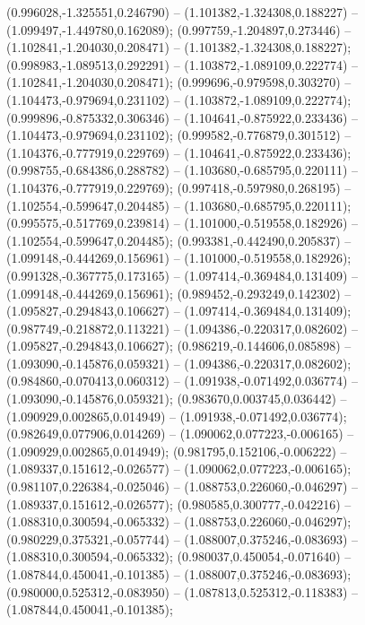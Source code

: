  (0.996028,-1.325551,0.246790) -- (1.101382,-1.324308,0.188227) -- (1.099497,-1.449780,0.162089);
 (0.997759,-1.204897,0.273446) -- (1.102841,-1.204030,0.208471) -- (1.101382,-1.324308,0.188227);
 (0.998983,-1.089513,0.292291) -- (1.103872,-1.089109,0.222774) -- (1.102841,-1.204030,0.208471);
 (0.999696,-0.979598,0.303270) -- (1.104473,-0.979694,0.231102) -- (1.103872,-1.089109,0.222774);
 (0.999896,-0.875332,0.306346) -- (1.104641,-0.875922,0.233436) -- (1.104473,-0.979694,0.231102);
 (0.999582,-0.776879,0.301512) -- (1.104376,-0.777919,0.229769) -- (1.104641,-0.875922,0.233436);
 (0.998755,-0.684386,0.288782) -- (1.103680,-0.685795,0.220111) -- (1.104376,-0.777919,0.229769);
 (0.997418,-0.597980,0.268195) -- (1.102554,-0.599647,0.204485) -- (1.103680,-0.685795,0.220111);
 (0.995575,-0.517769,0.239814) -- (1.101000,-0.519558,0.182926) -- (1.102554,-0.599647,0.204485);
 (0.993381,-0.442490,0.205837) -- (1.099148,-0.444269,0.156961) -- (1.101000,-0.519558,0.182926);
 (0.991328,-0.367775,0.173165) -- (1.097414,-0.369484,0.131409) -- (1.099148,-0.444269,0.156961);
 (0.989452,-0.293249,0.142302) -- (1.095827,-0.294843,0.106627) -- (1.097414,-0.369484,0.131409);
 (0.987749,-0.218872,0.113221) -- (1.094386,-0.220317,0.082602) -- (1.095827,-0.294843,0.106627);
 (0.986219,-0.144606,0.085898) -- (1.093090,-0.145876,0.059321) -- (1.094386,-0.220317,0.082602);
 (0.984860,-0.070413,0.060312) -- (1.091938,-0.071492,0.036774) -- (1.093090,-0.145876,0.059321);
 (0.983670,0.003745,0.036442) -- (1.090929,0.002865,0.014949) -- (1.091938,-0.071492,0.036774);
 (0.982649,0.077906,0.014269) -- (1.090062,0.077223,-0.006165) -- (1.090929,0.002865,0.014949);
 (0.981795,0.152106,-0.006222) -- (1.089337,0.151612,-0.026577) -- (1.090062,0.077223,-0.006165);
 (0.981107,0.226384,-0.025046) -- (1.088753,0.226060,-0.046297) -- (1.089337,0.151612,-0.026577);
 (0.980585,0.300777,-0.042216) -- (1.088310,0.300594,-0.065332) -- (1.088753,0.226060,-0.046297);
 (0.980229,0.375321,-0.057744) -- (1.088007,0.375246,-0.083693) -- (1.088310,0.300594,-0.065332);
 (0.980037,0.450054,-0.071640) -- (1.087844,0.450041,-0.101385) -- (1.088007,0.375246,-0.083693);
 (0.980000,0.525312,-0.083950) -- (1.087813,0.525312,-0.118383) -- (1.087844,0.450041,-0.101385);
